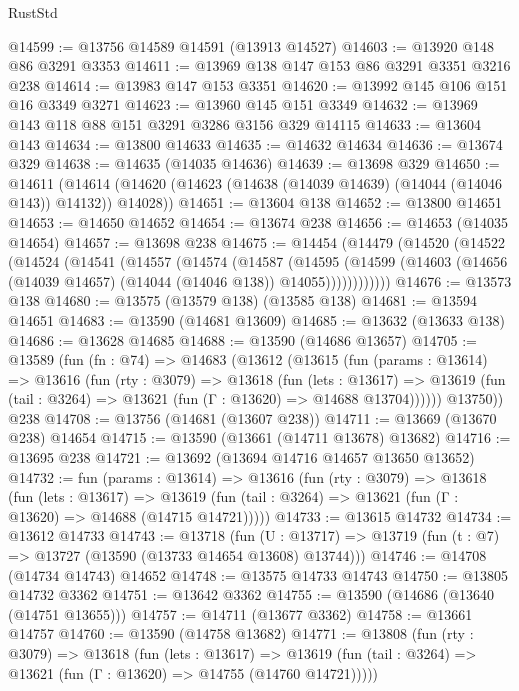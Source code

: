 \begin{lexlean}{RustStd}
\begin{coremodule}
@14599 := @13756 @14589 @14591 (@13913 @14527)
@14603 := @13920 @148 @86 @3291 @3353
@14611 := @13969 @138 @147 @153 @86 @3291 @3351 @3216 @238
@14614 := @13983 @147 @153 @3351
@14620 := @13992 @145 @106 @151 @16 @3349 @3271
@14623 := @13960 @145 @151 @3349
@14632 := @13969 @143 @118 @88 @151 @3291 @3286 @3156 @329 @14115
@14633 := @13604 @143
@14634 := @13800 @14633
@14635 := @14632 @14634
@14636 := @13674 @329
@14638 := @14635 (@14035 @14636)
@14639 := @13698 @329
@14650 := @14611
    (@14614 (@14620 (@14623 (@14638 (@14039 @14639) (@14044 (@14046 @143)) @14132)) @14028))
@14651 := @13604 @138
@14652 := @13800 @14651
@14653 := @14650 @14652
@14654 := @13674 @238
@14656 := @14653 (@14035 @14654)
@14657 := @13698 @238
@14675 := @14454
    (@14479
      (@14520
        (@14522
          (@14524
            (@14541
              (@14557
                (@14574
                  (@14587
                    (@14595
                      (@14599
                        (@14603 (@14656 (@14039 @14657) (@14044 (@14046 @138)) @14055))))))))))))
@14676 := @13573 @138
@14680 := @13575 (@13579 @138) (@13585 @138)
@14681 := @13594 @14651
@14683 := @13590 (@14681 @13609)
@14685 := @13632 (@13633 @138)
@14686 := @13628 @14685
@14688 := @13590 (@14686 @13657)
@14705 := @13589
    (fun (fn : @74) =>
    @14683
      (@13612
        (@13615
          (fun (params : @13614) =>
          @13616
            (fun (rty : @3079) =>
            @13618
              (fun (lets : @13617) =>
              @13619 (fun (tail : @3264) => @13621 (fun (Γ : @13620) => @14688 @13704))))))
        @13750))
    @238
@14708 := @13756 (@14681 (@13607 @238))
@14711 := @13669 (@13670 @238) @14654
@14715 := @13590 (@13661 (@14711 @13678) @13682)
@14716 := @13695 @238
@14721 := @13692 (@13694 @14716 @14657 @13650 @13652)
@14732 := fun (params : @13614) =>
  @13616
    (fun (rty : @3079) =>
    @13618
      (fun (lets : @13617) =>
      @13619 (fun (tail : @3264) => @13621 (fun (Γ : @13620) => @14688 (@14715 @14721)))))
@14733 := @13615 @14732
@14734 := @13612 @14733
@14743 := @13718
    (fun (U : @13717) => @13719 (fun (t : @7) => @13727 (@13590 (@13733 @14654 @13608) @13744)))
@14746 := @14708 (@14734 @14743) @14652
@14748 := @13575 @14733 @14743
@14750 := @13805 @14732 @3362
@14751 := @13642 @3362
@14755 := @13590 (@14686 (@13640 (@14751 @13655)))
@14757 := @14711 (@13677 @3362)
@14758 := @13661 @14757
@14760 := @13590 (@14758 @13682)
@14771 := @13808
    (fun (rty : @3079) =>
    @13618
      (fun (lets : @13617) =>
      @13619 (fun (tail : @3264) => @13621 (fun (Γ : @13620) => @14755 (@14760 @14721)))))

\end{coremodule}
\end{lexlean}
